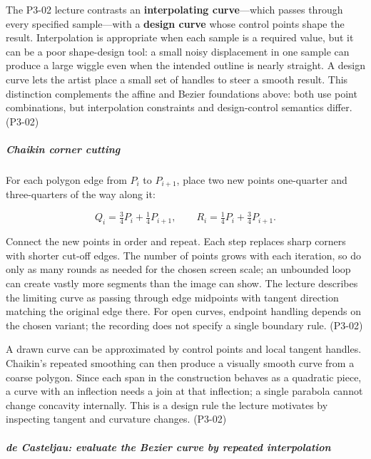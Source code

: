 The P3-02 lecture contrasts an \textbf{interpolating curve}---which passes through every specified sample---with a \textbf{design curve} whose control points shape the result. Interpolation is appropriate when each sample is a required value, but it can be a poor shape-design tool: a small noisy displacement in one sample can produce a large wiggle even when the intended outline is nearly straight. A design curve lets the artist place a small set of handles to steer a smooth result. This distinction complements the affine and Bezier foundations above: both use point combinations, but interpolation constraints and design-control semantics differ. (P3-02)

\subparagraph{Chaikin corner cutting}\label{03-visual-computing-i-ch001-chaikin-corner-cutting}

\hypertarget{03-visual-computing-i-ch001-chaikin-corner-cutting}{}

For each polygon edge from \(P_i\) to \(P_{i+1}\), place two new points one-quarter and three-quarters of the way along it:

\[
Q_i=\tfrac34P_i+\tfrac14P_{i+1},\qquad
R_i=\tfrac14P_i+\tfrac34P_{i+1}.
\]

Connect the new points in order and repeat. Each step replaces sharp corners with shorter cut-off edges. The number of points grows with each iteration, so do only as many rounds as needed for the chosen screen scale; an unbounded loop can create vastly more segments than the image can show. The lecture describes the limiting curve as passing through edge midpoints with tangent direction matching the original edge there. For open curves, endpoint handling depends on the chosen variant; the recording does not specify a single boundary rule. (P3-02)

A drawn curve can be approximated by control points and local tangent handles. Chaikin's repeated smoothing can then produce a visually smooth curve from a coarse polygon. Since each span in the construction behaves as a quadratic piece, a curve with an inflection needs a join at that inflection; a single parabola cannot change concavity internally. This is a design rule the lecture motivates by inspecting tangent and curvature changes. (P3-02)

\subparagraph{de Casteljau: evaluate the Bezier curve by repeated interpolation}\label{03-visual-computing-i-ch001-de-casteljau-evaluate-the-bezier-curve-by-repeated-interpolation}

\hypertarget{03-visual-computing-i-ch001-de-casteljau-evaluate-the-bezier-curve-by-repeated-interpolation}{}

